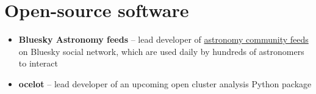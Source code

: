 \section*{Open-source software \href{\cvGitHubLink}{\faGithub}}

\begin{itemize}
    \item \textbf{Bluesky Astronomy feeds} -- lead developer of \href{https://github.com/emilyhunt/bluesky-astronomy-feeds}{astronomy community feeds} on Bluesky social network, which are used daily by hundreds of astronomers to interact
    \item \textbf{ocelot} -- lead developer of an upcoming open cluster analysis Python package
\end{itemize}